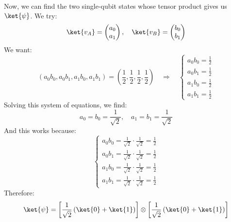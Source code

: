 \begin{itemize}
    Now, we can find the two single-qubit states whose tensor product gives us $\ket{\psi}$. We try:
    \begin{equation*}
        \ket{v_{A}} = \begin{pmatrix}
            a_{0} \\
            a_{1}
        \end{pmatrix},
        \quad
        \ket{v_{B}} = \begin{pmatrix}
            b_{0} \\
            b_{1}
        \end{pmatrix}
    \end{equation*}
    We want:
    \begin{equation*}
        \left(a_0 b_0, a_0 b_1, a_1 b_0, a_1 b_1\right) = \left(\frac{1}{2}, \frac{1}{2}, \frac{1}{2}, \frac{1}{2}\right)
        \quad \Rightarrow \quad
        \begin{cases}
            a_0 b_0 = \frac{1}{2} \\[.3em]
            a_0 b_1 = \frac{1}{2} \\[.3em]
            a_1 b_0 = \frac{1}{2} \\[.3em]
            a_1 b_1 = \frac{1}{2}
        \end{cases}
    \end{equation*}
    Solving this system of equations, we find:
    \begin{equation*}
        a_0 = b_0 = \frac{1}{\sqrt{2}}, \quad a_1 = b_1 = \frac{1}{\sqrt{2}}
    \end{equation*}
    And this works because:
    \begin{equation*}
        \begin{cases}
            a_0 b_0 = \frac{1}{\sqrt{2}} \cdot \frac{1}{\sqrt{2}} = \frac{1}{2} \\[.3em]
            a_0 b_1 = \frac{1}{\sqrt{2}} \cdot \frac{1}{\sqrt{2}} = \frac{1}{2} \\[.3em]
            a_1 b_0 = \frac{1}{\sqrt{2}} \cdot \frac{1}{\sqrt{2}} = \frac{1}{2} \\[.3em]
            a_1 b_1 = \frac{1}{\sqrt{2}} \cdot \frac{1}{\sqrt{2}} = \frac{1}{2}
        \end{cases}
    \end{equation*}
    Therefore:
    \begin{equation*}
        \ket{\psi} = \left[ \frac{1}{\sqrt{2}} \left(\ket{0} + \ket{1}\right) \right] \otimes \left[ \frac{1}{\sqrt{2}} \left(\ket{0} + \ket{1}\right) \right]
    \end{equation*}

\end{itemize}
